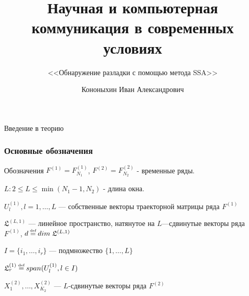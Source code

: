 \documentclass[11pt]{beamer}
\newcommand\eqdef{\mathrel{\stackrel{\makebox[0pt]{\mbox{\normalfont\tiny def}}}{=}}}
\begin{document}
	\author{Кононыхин Иван Александрович}

	\title[]{Научная и компьютерная коммуникация в современных условиях}
	\subtitle{<<Обнаружение разладки с помощью метода SSA>>}
	\date{\number\year}
	\begin{frame}[plain]
		\maketitle 
	\end{frame}

	\begin{frame}
		\centering
		Введение в теорию
	\end{frame}

	\begin{frame}
		\frametitle{Основные обозначения}
		\begin{block}{Обозначения}
			$F^{(1)} = F_{N_1}^{(1)}$, $F^{(2)} = F_{N_2}^{(2)}$ - временные ряды.
			
			$L: 2 \leq L \leq \min(N_1 - 1, N_2)$ - длина окна.
			
			$ U_l^{(1)}, l = 1, \dotsc, L $ --- собственные векторы траекторной матрицы ряда $ F^{(1)} $
			
			$\mathfrak{L}^{(L, 1)}$ --- линейное пространство, натянутое на $L$---сдвинутые векторы ряда $F^{(1)}$, $ d \eqdef dim \; \mathfrak{L}^{(L, 1)} $
			
			$ I = \{i_1, \dotsc, i_r\} $ --- подмножество $ \{1, \dotsc, L\} $
			
			$ \mathfrak{L}_r^{(1)} \eqdef span(U_l^{(1)}, l \in I) $
			
			$ X_1^{(2)}, \dotsc, X_{K_2}^{(2)} $ --- $L$-сдвинутые векторы ряда $F^{(2)} $
		\end{block}
	\end{frame}
\end{document}
